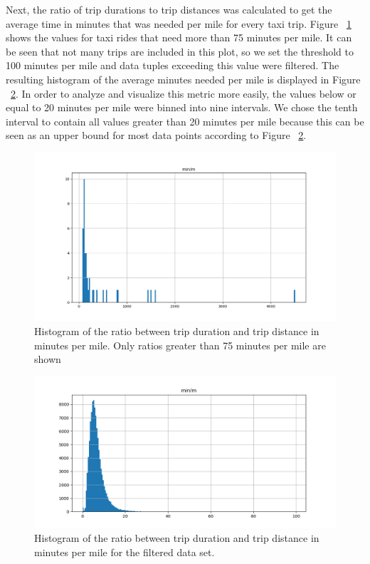 \documentclass[sigconf, authorversion, nonacm=true]{acmart}
\begin{document}
Next, the ratio of trip durations to trip distances was calculated to get the average time in minutes that was needed per mile for every taxi trip. Figure ~\ref{fig:hist_durdist_out} shows the values for taxi rides that need more than 75 minutes per mile. It can be seen that not many trips are included in this plot, so we set the threshold to 100 minutes per mile and data tuples exceeding this value were filtered. The resulting histogram of the average minutes needed per mile is displayed in Figure ~\ref{fig:hist_durdist_filt}. In order to analyze and visualize this metric more easily, the values below or equal to 20 minutes per mile were binned into nine intervals. We chose the tenth interval to contain all values greater than 20 minutes per mile because this can be seen as an upper bound for most data points according to Figure ~\ref{fig:hist_durdist_filt}. 

\begin{figure}[h]
  \centering
  \includegraphics[width=\linewidth]{hist_durtodist_outliers}
  \caption{Histogram of the ratio between trip duration and trip distance in minutes per mile. Only ratios greater than 75 minutes per mile are shown}
  \label{fig:hist_durdist_out}
\end{figure}

\begin{figure}[h]
  \centering
  \includegraphics[width=\linewidth]{hist_durtodist_filtered}
  \caption{Histogram of the ratio between trip duration and trip distance in minutes per mile for the filtered data set.}
  \label{fig:hist_durdist_filt}
\end{figure}
\end{document}
